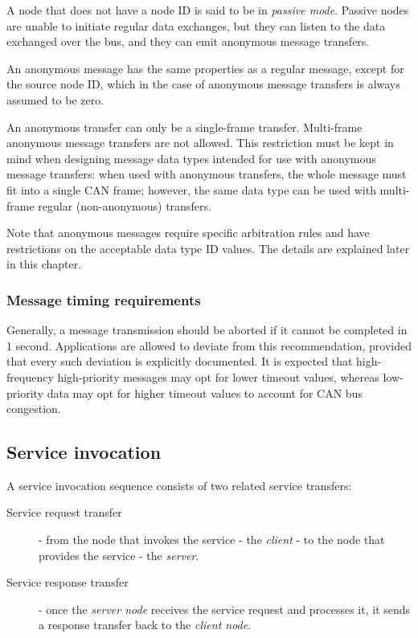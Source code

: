 A node that does not have a node ID is said to be in \emph{passive mode}.
Passive nodes are unable to initiate regular data exchanges,
but they can listen to the data exchanged over the bus,
and they can emit anonymous message transfers.

An anonymous message has the same properties as a regular message, except for the source node ID,
which in the case of anonymous message transfers is always assumed to be zero.

An anonymous transfer can only be a single-frame transfer. Multi-frame anonymous message transfers are not allowed.
This restriction must be kept in mind when designing message data types
intended for use with anonymous message transfers:
when used with anonymous transfers, the whole message must fit into a single CAN frame;
however, the same data type can be used with multi-frame regular (non-anonymous) transfers.

Note that anonymous messages require specific arbitration rules and have restrictions on the acceptable
data type ID values. The details are explained later in this chapter.

\subsubsection{Message timing requirements}

Generally, a message transmission should be aborted if it cannot be completed in 1 second.
Applications are allowed to deviate from this recommendation,
provided that every such deviation is explicitly documented.
It is expected that high-frequency high-priority messages may opt for lower timeout values,
whereas low-priority data may opt for higher timeout values to account for CAN bus congestion.

\subsection{Service invocation}

A service invocation sequence consists of two related service transfers:

\begin{description}
    \item[Service request transfer] - from the node that invokes the service - the \emph{client} - to the node that
    provides the service - the \emph{server}.

    \item[Service response transfer] - once the \emph{server node} receives the service request and processes it,
    it sends a response transfer back to the \emph{client node}.
\end{description}

